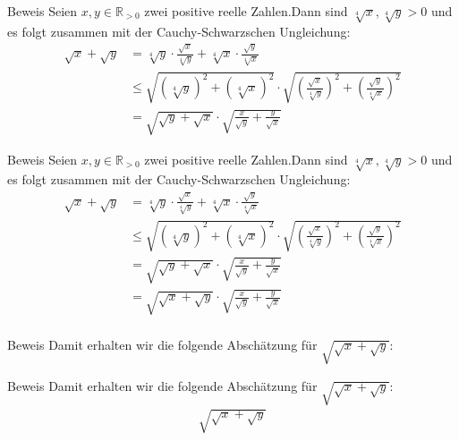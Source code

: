 \documentclass[10pt]{beamer}
\def\bR{\mathbb{R}}
\begin{document}
\begin{frame}{Beweis}
    Seien \( x, y \in \bR_{> 0} \) zwei positive reelle Zahlen.Dann sind \( \sqrt[4]{x}, \sqrt[4]{y} > 0 \) und es folgt zusammen mit der Cauchy-Schwarzschen Ungleichung:
    \begin{align*}
        \sqrt{x} + \sqrt{y}
        & = \sqrt[4]{y} \cdot \frac{\sqrt{x}}{\sqrt[4]{y}} + \sqrt[4]{x} \cdot \frac{\sqrt{y}}{\sqrt[4]{x}} \\
        & \leq \sqrt{\left( \sqrt[4]{y} \right)^{2} + \left( \sqrt[4]{x} \right)^{2}} \cdot \sqrt{\left( \frac{\sqrt{x}}{\sqrt[4]{y}} \right)^{2} + \left( \frac{\sqrt{y}}{\sqrt[4]{x}} \right)^{2}} \\
        & = \sqrt{\sqrt{y} + \sqrt{x}} \cdot \sqrt{\frac{x}{\sqrt{y}} + \frac{y}{\sqrt{x}}}
    \end{align*}
\end{frame}



\begin{frame}{Beweis}
    Seien \( x, y \in \bR_{> 0} \) zwei positive reelle Zahlen.Dann sind \( \sqrt[4]{x}, \sqrt[4]{y} > 0 \) und es folgt zusammen mit der Cauchy-Schwarzschen Ungleichung:
    \begin{align*}
        \sqrt{x} + \sqrt{y}
        & = \sqrt[4]{y} \cdot \frac{\sqrt{x}}{\sqrt[4]{y}} + \sqrt[4]{x} \cdot \frac{\sqrt{y}}{\sqrt[4]{x}} \\
        & \leq \sqrt{\left( \sqrt[4]{y} \right)^{2} + \left( \sqrt[4]{x} \right)^{2}} \cdot \sqrt{\left( \frac{\sqrt{x}}{\sqrt[4]{y}} \right)^{2} + \left( \frac{\sqrt{y}}{\sqrt[4]{x}} \right)^{2}} \\
        & = \sqrt{\sqrt{y} + \sqrt{x}} \cdot \sqrt{\frac{x}{\sqrt{y}} + \frac{y}{\sqrt{x}}} \\
        & = \sqrt{\sqrt{x} + \sqrt{y}} \cdot \sqrt{\frac{x}{\sqrt{y}} + \frac{y}{\sqrt{x}}} \\
    \end{align*}
\end{frame}


    
\begin{frame}{Beweis}
    Damit erhalten wir die folgende Abschätzung für \( \sqrt{\sqrt{x} + \sqrt{y}} \):
\end{frame}



\begin{frame}{Beweis}
    Damit erhalten wir die folgende Abschätzung für \( \sqrt{\sqrt{x} + \sqrt{y}} \):
    \begin{align*}
        \sqrt{\sqrt{x} + \sqrt{y}}
    \end{align*}
\end{frame}
\end{document}
